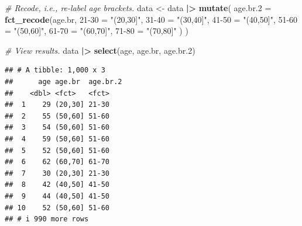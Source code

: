 \documentclass[
]{book}
\newenvironment{Shaded}{\begin{snugshade}}{\end{snugshade}}
\newcommand{\AttributeTok}[1]{\textcolor[rgb]{0.13,0.29,0.53}{#1}}
\newcommand{\CommentTok}[1]{\textcolor[rgb]{0.56,0.35,0.01}{\textit{#1}}}
\newcommand{\FloatTok}[1]{\textcolor[rgb]{0.00,0.00,0.81}{#1}}
\newcommand{\FunctionTok}[1]{\textcolor[rgb]{0.13,0.29,0.53}{\textbf{#1}}}
\newcommand{\NormalTok}[1]{#1}
\newcommand{\OtherTok}[1]{\textcolor[rgb]{0.56,0.35,0.01}{#1}}
\newcommand{\SpecialCharTok}[1]{\textcolor[rgb]{0.81,0.36,0.00}{\textbf{#1}}}
\newcommand{\StringTok}[1]{\textcolor[rgb]{0.31,0.60,0.02}{#1}}
\begin{document}
\begin{Shaded}
\begin{Highlighting}[]
\CommentTok{\# Recode, i.e., re{-}label age brackets.}
\NormalTok{data }\OtherTok{\textless{}{-}}\NormalTok{ data }\SpecialCharTok{|\textgreater{}} 
  \FunctionTok{mutate}\NormalTok{(}
    \AttributeTok{age.br.2 =} \FunctionTok{fct\_recode}\NormalTok{(age.br,}
      \StringTok{\textasciigrave{}}\AttributeTok{21{-}30}\StringTok{\textasciigrave{}} \OtherTok{=} \StringTok{"(20,30]"}\NormalTok{,}
      \StringTok{\textasciigrave{}}\AttributeTok{31{-}40}\StringTok{\textasciigrave{}} \OtherTok{=} \StringTok{"(30,40]"}\NormalTok{,}
      \StringTok{\textasciigrave{}}\AttributeTok{41{-}50}\StringTok{\textasciigrave{}} \OtherTok{=} \StringTok{"(40,50]"}\NormalTok{,}
      \StringTok{\textasciigrave{}}\AttributeTok{51{-}60}\StringTok{\textasciigrave{}} \OtherTok{=} \StringTok{"(50,60]"}\NormalTok{,}
      \StringTok{\textasciigrave{}}\AttributeTok{61{-}70}\StringTok{\textasciigrave{}} \OtherTok{=} \StringTok{"(60,70]"}\NormalTok{,}
      \StringTok{\textasciigrave{}}\AttributeTok{71{-}80}\StringTok{\textasciigrave{}} \OtherTok{=} \StringTok{"(70,80]"}
\NormalTok{    )}
\NormalTok{  )}

\CommentTok{\# View results.}
\NormalTok{data }\SpecialCharTok{|\textgreater{}} 
  \FunctionTok{select}\NormalTok{(age, age.br, age.br}\FloatTok{.2}\NormalTok{)}
\end{Highlighting}
\end{Shaded}

\begin{verbatim}
## # A tibble: 1,000 x 3
##      age age.br  age.br.2
##    <dbl> <fct>   <fct>   
##  1    29 (20,30] 21-30   
##  2    55 (50,60] 51-60   
##  3    54 (50,60] 51-60   
##  4    59 (50,60] 51-60   
##  5    52 (50,60] 51-60   
##  6    62 (60,70] 61-70   
##  7    30 (20,30] 21-30   
##  8    42 (40,50] 41-50   
##  9    44 (40,50] 41-50   
## 10    52 (50,60] 51-60   
## # i 990 more rows
\end{verbatim}
\end{document}
